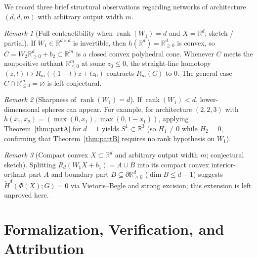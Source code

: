 \documentclass[11pt]{article}
\theoremstyle{plain}
\theoremstyle{definition}
\theoremstyle{remark}
\newtheorem{remark}{Remark}
\DeclareMathOperator{\rank}{rank}
\begin{document}
We record three brief structural observations regarding networks of architecture $(d, d, m)$ with arbitrary output width $m$.

\begin{remark}[Full contractibility when $\rank(W_1) = d$ and $X = \mathbb{R}^d$; sketch / partial]
If $W_1 \in \mathbb{R}^{d \times d}$ is invertible, then $h(\mathbb{R}^d) = \mathbb{R}_{\ge 0}^d$ is convex, so $C = W_2 \mathbb{R}_{\ge 0}^d + b_2 \subset \mathbb{R}^m$ is a closed convex polyhedral cone. Whenever $C$ meets the nonpositive orthant $\mathbb{R}_{\le 0}^m$ at some $z_0 \le 0$, the straight-line homotopy $(z, t) \mapsto R_m((1-t)z + t z_0)$ contracts $R_m(C)$ to $0$. The general case $C \cap \mathbb{R}_{\le 0}^m = \varnothing$ is left conjectural.
\end{remark}

\begin{remark}[Sharpness of $\rank(W_1) = d$]
If $\rank(W_1) < d$, lower-dimensional spheres can appear. For example, for architecture $(2, 2, 3)$ with $h(x_1, x_2) = (\max(0, x_1),\, \max(0, 1 - x_1))$, applying Theorem~\ref{thm:partA} for $d = 1$ yields $S^1 \subset \mathbb{R}^3$ (so $H_1 \neq 0$ while $H_2 = 0$, confirming that Theorem~\ref{thm:partB} requires no rank hypothesis on $W_1$).
\end{remark}

\begin{remark}[Compact convex $X \subset \mathbb{R}^d$ and arbitrary output width $m$; conjectural sketch]
Splitting $R_d(W_1 X + b_1) = A \cup B$ into its compact convex interior-orthant part $A$ and boundary part $B \subseteq \partial \mathbb{R}_{\ge 0}^d$ ($\dim B \le d - 1$) suggests $\check{H}^d(\Phi(X); G) = 0$ via Vietoris--Begle and strong excision; this extension is left unproved here.
\end{remark}

\section{Formalization, Verification, and Attribution}
\end{document}
